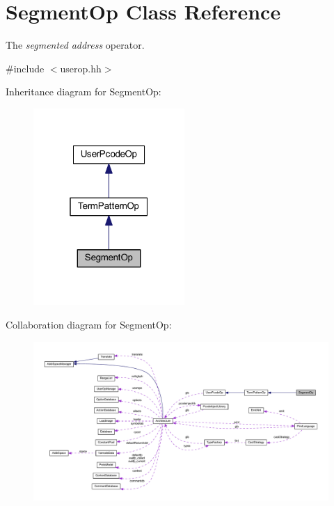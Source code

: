 \hypertarget{class_segment_op}{}\section{Segment\+Op Class Reference}
\label{class_segment_op}


The {\itshape segmented} {\itshape address} operator.  




{\ttfamily \#include $<$userop.\+hh$>$}



Inheritance diagram for Segment\+Op\+:
\nopagebreak
\begin{figure}[H]
\begin{center}
\leavevmode
\includegraphics[width=163pt]{class_segment_op__inherit__graph}
\end{center}
\end{figure}


Collaboration diagram for Segment\+Op\+:
\nopagebreak
\begin{figure}[H]
\begin{center}
\leavevmode
\includegraphics[width=350pt]{class_segment_op__coll__graph}
\end{center}
\end{figure}
